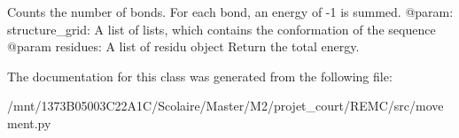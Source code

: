 \begin{DoxyVerb}Counts the number of bonds. For each bond, an energy of -1 is
summed.
    @param: structure_grid: A list of lists, which contains the
                   conformation of the sequence
    @param residues: A list of residu object
    Return the total energy.
\end{DoxyVerb}
 

The documentation for this class was generated from the following file\+:\begin{DoxyCompactItemize}
\item 
/mnt/1373\+B05003\+C22\+A1\+C/\+Scolaire/\+Master/\+M2/projet\+\_\+court/\+R\+E\+M\+C/src/movement.\+py\end{DoxyCompactItemize}
